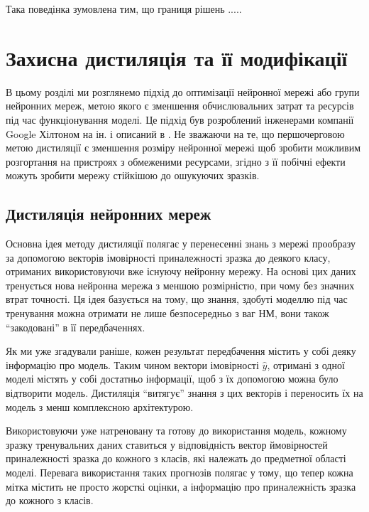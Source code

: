 \documentclass[14pt,a4paper]{extarticle}
\newcounter{e}
\numberwithin{equation}{section}
\numberwithin{figure}{section}
\begin{document}
 Така поведінка зумовлена тим, що границя рішень .....
 
 
 
 \newpage
 \thispagestyle{empty}
 \section{Захисна дистиляція та її модифікації}
  В цьому розділі ми розглянемо підхід до оптимізації нейронної мережі або групи нейронних мереж, метою якого є зменшення обчислювальних затрат та ресурсів під час функціонування моделі. Це підхід був розроблений інженерами компанії Google Хілтоном на ін. і описаний в \cite{distillation}. Не зважаючи на те, що першочерговою метою дистиляції є зменшення розміру нейронної мережі щоб зробити можливим розгортання на пристроях з обмеженими ресурсами, згідно з \cite{defencive-distillation} її побічні ефекти можуть зробити мережу стійкішою до ошукуючих зразків.
 
 \subsection{Дистиляція нейронних мереж}
 
 Основна ідея методу дистиляції полягає у перенесенні знань з мережі прообразу за допомогою векторів імовірності приналежності зразка до деякого класу, отриманих використовуючи вже існуючу нейронну мережу. На основі цих даних тренується нова нейронна мережа з меншою розмірністю, при чому без значних втрат точності. Ця ідея базується на тому, що знання, здобуті моделлю під час тренування можна отримати не лише безпосередньо з ваг НМ, вони також ``закодовані'' в її передбаченнях.
 
 Як ми уже згадували раніше, кожен результат передбачення містить у собі деяку інформацію про модель. Таким чином вектори імовірності $\hat{y}$, отримані з одної моделі містять у собі достатньо інформації, щоб з їх допомогою можна було відтворити модель. Дистиляція ``витягує'' знання з цих векторів і переносить їх на модель з менш комплексною архітектурою.
 
 Використовуючи уже натреновану та готову до використання модель, кожному зразку тренувальних даних ставиться у відповідність вектор ймовірностей приналежності зразка до кожного з класів, які належать до предметної області моделі. Перевага використання таких прогнозів полягає у тому, що тепер кожна мітка містить не просто жорсткі оцінки, а інформацію про приналежність зразка до кожного з класів.
 
 
\end{document}
